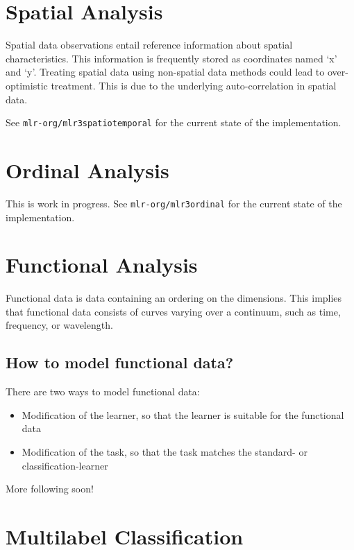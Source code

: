 \documentclass[
  11pt,
  parskip=half,
  DIV=calc,
  BCOR=10mm,
  x11names]{scrbook}
\providecommand{\tightlist}{%
  \setlength{\itemsep}{0pt}\setlength{\parskip}{0pt}}
\begin{document}
\hypertarget{spatial}{%
\section{Spatial Analysis}\label{spatial}}

Spatial data observations entail reference information about spatial characteristics.
This information is frequently stored as coordinates named `x' and `y'.
Treating spatial data using non-spatial data methods could lead to over-optimistic treatment.
This is due to the underlying auto-correlation in spatial data.

See \texttt{mlr-org/mlr3spatiotemporal} for the current state of the implementation.

\hypertarget{ordinal}{%
\section{Ordinal Analysis}\label{ordinal}}

This is work in progress.
See \texttt{mlr-org/mlr3ordinal} for the current state of the implementation.

\hypertarget{functional}{%
\section{Functional Analysis}\label{functional}}

Functional data is data containing an ordering on the dimensions.
This implies that functional data consists of curves varying over a continuum, such as time, frequency, or wavelength.

\hypertarget{how-to-model-functional-data}{%
\subsection{How to model functional data?}\label{how-to-model-functional-data}}

There are two ways to model functional data:

\begin{itemize}
\tightlist
\item
  Modification of the learner, so that the learner is suitable for the functional data
\item
  Modification of the task, so that the task matches the standard- or classification-learner
\end{itemize}

More following soon!

\hypertarget{multilabel}{%
\section{Multilabel Classification}\label{multilabel}}
\end{document}
